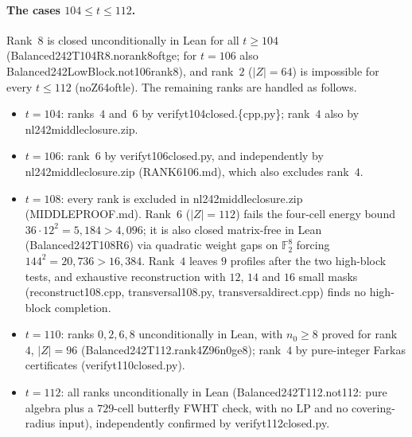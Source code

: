 \documentclass[11pt]{article}
\theoremstyle{definition}
\newcommand{\F}{\mathbb{F}}
\newcommand{\code}[1]{{\ttfamily\small\renewcommand{\_}{\textunderscore\allowbreak}#1}}
\begin{document}
\paragraph{The cases $104 \le t \le 112$.}
Rank~$8$ is closed unconditionally in Lean for all $t \ge 104$ (\code{Balanced242T104R8.no\_rank8\_of\_t\_ge\_104}; for $t = 106$ also \code{Balanced242LowBlock.no\_t106\_rank8}), and rank~$2$ ($|Z| = 64$) is impossible for every $t \le 112$ (\code{no\_Z64\_of\_t\_le\_112}). The remaining ranks are handled as follows.
\begin{itemize}[nosep]
  \item $t = 104$: ranks~$4$ and~$6$ by \code{verify\_t104\_closed.\{cpp,py\}}; rank~$4$ also by \code{nl242\_middle\_closure.zip}.
  \item $t = 106$: rank~$6$ by \code{verify\_t106\_closed.py}, and independently by \code{nl242\_middle\_closure.zip} (\code{RANK6\_106.md}), which also excludes rank~$4$.
  \item $t = 108$: every rank is excluded in \code{nl242\_middle\_closure.zip} (\code{MIDDLE\_PROOF.md}). Rank~$6$ ($|Z| = 112$) fails the four-cell energy bound $36 \cdot 12^2 = 5{,}184 > 4{,}096$; it is also closed matrix-free in Lean (\code{Balanced242T108R6}) via quadratic weight gaps on $\F_2^8$ forcing $144^2 = 20{,}736 > 16{,}384$. Rank~$4$ leaves $9$ profiles after the two high-block tests, and exhaustive reconstruction with $12$, $14$ and $16$ small masks (\code{reconstruct\_108.cpp}, \code{transversal\_108.py}, \code{transversal\_direct.cpp}) finds no high-block completion.
  \item $t = 110$: ranks $0, 2, 6, 8$ unconditionally in Lean, with $n_0 \ge 8$ proved for rank~$4$, $|Z| = 96$ (\code{Balanced242T112.rank4\_Z96\_n0\_ge8}); rank~$4$ by pure-integer Farkas certificates (\code{verify\_t110\_closed.py}).
  \item $t = 112$: all ranks unconditionally in Lean (\code{Balanced242T112.no\_t112}: pure algebra plus a $729$-cell butterfly FWHT check, with no LP and no covering-radius input), independently confirmed by \code{verify\_t112\_closed.py}.
\end{itemize}
\end{document}
